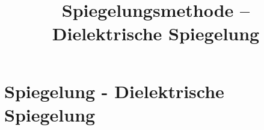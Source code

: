
\usepackage{tikz-3dplot}
\title[TET Vertiefung: Spiegelungsmethode -- Dielektrische Spiegelung]{Spiegelungsmethode -- Dielektrische Spiegelung}


% 
% 

\maketitle

% 
% 
\section{Spiegelung - Dielektrische Spiegelung}


